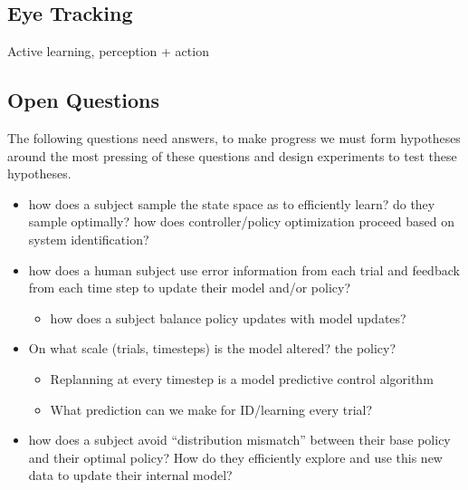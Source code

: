 \documentclass[
  a4paper,
]{article}
\providecommand{\tightlist}{%
  \setlength{\itemsep}{0pt}\setlength{\parskip}{0pt}}
\begin{document}
\hypertarget{eye-tracking}{%
\subsection{Eye Tracking}\label{eye-tracking}}

Active learning, perception + action

\hypertarget{open-questions}{%
\subsection{Open Questions}\label{open-questions}}

The following questions need answers, to make progress we must form
hypotheses around the most pressing of these questions and design
experiments to test these hypotheses.

\begin{itemize}
\item
  how does a subject sample the state space as to efficiently learn? do
  they sample optimally? how does controller/policy optimization proceed
  based on system identification?
\item
  how does a human subject use error information from each trial and
  feedback from each time step to update their model and/or policy?

  \begin{itemize}
  \tightlist
  \item
    how does a subject balance policy updates with model updates?
  \end{itemize}
\item
  On what scale (trials, timesteps) is the model altered? the policy?

  \begin{itemize}
  \tightlist
  \item
    Replanning at every timestep is a model predictive control algorithm
  \item
    What prediction can we make for ID/learning every trial?
  \end{itemize}
\item
  how does a subject avoid ``distribution mismatch'' between their base
  policy and their optimal policy? How do they efficiently explore and
  use this new data to update their internal model?


\end{itemize}
\end{document}
